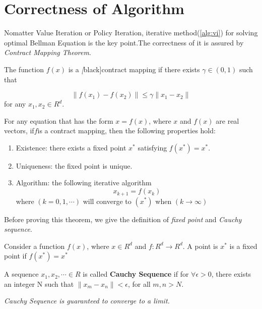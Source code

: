 \section{Correctness of Algorithm}
Nomatter Value Iteration or Policy Iteration, iterative method(\ref{alg:vi}) for solving optimal Bellman Equation is the key point.The correctness of it is assured by \emph{Contract Mapping Theorem}. \par
\begin{definition}
    The function $f(x)$ is a \emph[black]{contract mapping} if there exists $\gamma \in (0,1)$ such that 

    \begin{equation}
        \|f(x_1)-f(x_2)\| \le \gamma \|x_1-x_2\|
    \end{equation}
    for any $x_1,x_2 \in R^d$.
\end{definition}

\begin{theorem}\label{thm:cm1}
    For any equation that has the form $x=f(x)$, where $x$ and $f(x)$ are real vectors, if$f$is a contract mapping, then the following properties hold:
    \begin{enumerate}
        \item Existence: there exists a fixed point $x^{*}$ satisfying $f(x^{*})=x^{*}$.
        \item Uniqueness: the fixed point is unique.
        \item Algorithm: the following iterative algorithm
                \begin{equation}
                    x_{k+1}=f(x_{k})
                \end{equation}
             where $(k=0,1,\cdots)$ will converge to $(x^{*})$ when $(k \to \infty)$
    \end{enumerate}
\end{theorem}

Before proving this theorem, we give the definition of \emph{fixed point} and \emph{Cauchy sequence}.
\begin{definition}
    Consider a function $f(x)$, where $x \in R^{d}$ and $f: R^d \to R^d$. A point is  $x^{*}$ is a fixed point if  $f(x^*)=x^*$
\end{definition}

\begin{definition}
    A sequence $x_1,x_2,\cdots \in R$ is called \textbf{Cauchy Sequence} if for $\forall \epsilon >0$, there exists an integer N such that $\|x_m-x_n\|<\epsilon$, for all $m,n>N$. \par
    \emph{Cauchy Sequence is guaranteed to converge to a limit.}
\end{definition}

